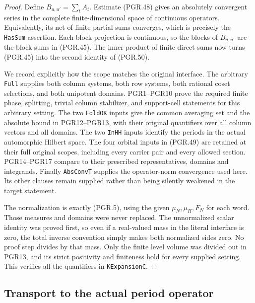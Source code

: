 \documentclass[11pt,a4paper]{article}
\numberwithin{equation}{section}
\theoremstyle{remark}\newtheorem{remark}[theorem]{Remark}
\begin{document}
\begin{proof}
Define \(B_{u,u'}=\sum_tA_t\).  Estimate (PGR.48) gives an
absolutely convergent series in the complete finite-dimensional
space of continuous operators.  Equivalently, its net of finite
partial sums converges, which is precisely the \texttt{Has\allowbreak Sum}
assertion.  Each block projection is continuous, so the blocks of
\(B_{u,u'}\) are the block sums in (PGR.45).  The inner product
of finite direct sums now turns (PGR.45) into the second identity
of (PGR.50).

We record explicitly how the scope matches the original interface.
The arbitrary \texttt{Full} supplies both column systems, both
row systems, both rational coset selections, and both unipotent
domains.  PGR1--PGR10 prove the required finite phase, splitting,
trivial column stabilizer, and support-cell statements for this
arbitrary setting.  The two \texttt{Fold\allowbreak OK} inputs give the common
averaging set and the absolute bound in PGR12--PGR13, with their
original quantifiers over all column vectors and all domains.
The two \texttt{In\allowbreak HH} inputs identify the periods in the actual
automorphic Hilbert space.  The four orbital inputs in (PGR.49)
are retained at their full original scopes, including every
carrier pair and every allowed section.  PGR14--PGR17 compare to
their prescribed representatives, domains and integrands.
Finally \texttt{Abs\allowbreak Conv\allowbreak T} supplies the operator-norm convergence
used here.  Its other clauses remain supplied rather than being
silently weakened in the target statement.

The normalization is exactly (PGR.5), using the given
\(\mu_N,\mu_H,F_N\) for each word.  Those measures and
domains were never replaced.  The unnormalized scalar identity
was proved first, so even if a real-valued mass in the literal
interface is zero, the total inverse convention simply makes both
normalized sides zero.  No proof step divides by that mass.
Only the finite level volume was divided out in PGR13, and its
strict positivity and finiteness hold for every supplied setting.
This verifies all the quantifiers in \texttt{KExpansion\allowbreak C}.
\end{proof}

\subsection{Transport to the actual period operator}

\end{document}

